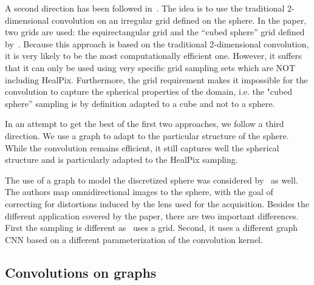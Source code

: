 \documentclass[final,twocolumn,3p,times,authoryear]{elsarticle}
\newcommand{\nati}[1]{{\color[rgb]{.1,.6,.1}{#1}}}
\newcommand{\todo}[1]{{\color[rgb]{.6,.1,.6}{#1}}}
\newcommand{\1}{\b{1}}              %
\newcommand{\0}{\b{0}}              %
\begin{document}
A second direction has been followed in~\citet{boomsma2017spherical}. The idea is
to use the traditional 2-dimensional convolution on an irregular grid defined on the
sphere. In the paper, two grids are used: the equirectangular grid and the ``cubed
sphere'' grid defined by~\citet{ronchi1996cubed}. \nati{Do we need a plot of the equirectangular and cubed sphere sampling?} Because this
approach is based on the traditional 2-dimensional convolution, it is very likely to be the
most computationally efficient one. However, it suffers that it can only be used using very
specific grid sampling sets which are NOT including HealPix. Furthermore, the
grid requirement makes it impossible for the convolution to capture the
spherical properties of the domain, i.e. the "cubed sphere” sampling is by
definition adapted to a cube and not to a sphere.
\todo{border effects? \nati{@mdeff what are you thinking about here?}}

In an attempt to get the best of the first two approaches, we follow a third
direction. We use a graph to adapt to the particular structure of the sphere.
While the convolution remains efficient, it still captures well the spherical
structure and is particularly adapted to the HealPix sampling.

The use of a graph to model the discretized sphere was considered by~\citet{khasanova2017graph} as well. The authors map omnidirectional images to the sphere, with the goal of correcting for distortions induced by the lens used for the acquisition.
Besides the different application covered by the paper, there are two important
differences. First the sampling is different as~\cite{khasanova2017graph} uses a
grid. Second, it uses a different graph CNN based on a different parameterization
of the convolution kernel.


\subsection{Convolutions on graphs}
\todo{Maybe we just describe convolutions on sphere and graph, i.e: do we really need all these three subsections? Maybe simply merge them?}

\nati{I think that citing Bruna is to much... According to me, the goal of this subsection should not be to cite everything that exist. But should focus on
1) be fair and say that they are other graph convolutions that can be used, 2) show some connections between graph CNNs ang group equivariant CNNs (Done), and 3) suggest that they are possible extensions of what we do.}
\end{document}
